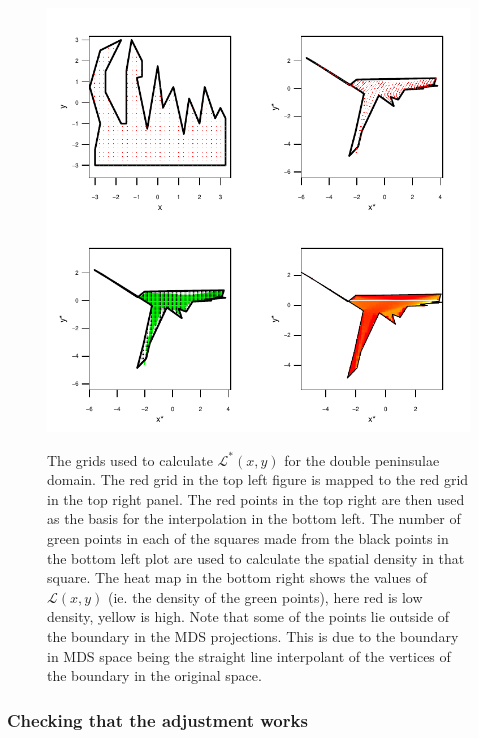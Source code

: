 \begin{figure}
\centering
\includegraphics{mds/figs/densgrid.pdf} \\
\caption{The grids used to calculate $\mathcal{L}^*(x,y)$ for the double peninsulae domain. The red grid in the top left figure is mapped to the red grid in the top right panel. The red points in the top right are then used as the basis for the interpolation in the bottom left. The number of green points in each of the squares made from the black points in the bottom left plot are used to calculate the spatial density in that square. The heat map in the bottom right shows the values of $\mathcal{L}(x,y)$ (ie. the density of the green points), here red is low density, yellow is high. Note that some of the points lie outside of the boundary in the MDS projections. This is due to the boundary in MDS space being the straight line interpolant of the vertices of the boundary in the original space.}
\label{densgrid}
\end{figure}

\subsubsection{Checking that the adjustment works}

